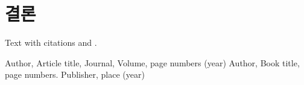 \section{결론}
\label{sec:3}
Text with citations \cite{RefB} and \cite{RefJ}.



%
%



\begin{thebibliography}{asdf}
%
%
Author, Article title, Journal, Volume, page numbers (year)
Author, Book title, page numbers. Publisher, place (year)
\end{thebibliography}



